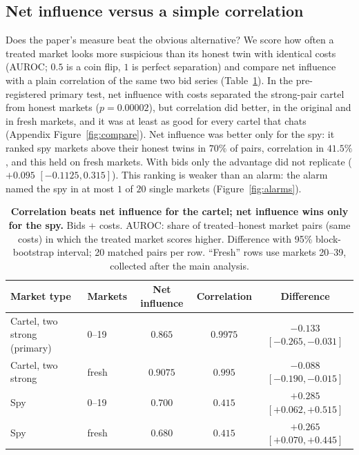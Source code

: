 \subsection{Net influence versus a simple correlation}
Does the paper's measure beat the obvious alternative? We score how often a
treated market looks more suspicious than its honest twin with identical
costs (AUROC; $0.5$ is a coin flip, $1$ is perfect separation) and compare
net influence with a plain correlation of the same two bid series
(Table~\ref{tab:compare}). In the pre-registered primary test, net
influence with costs separated the strong-pair cartel from honest markets
($p=0.00002$), but correlation did better, in the original and in fresh
markets, and it was at least as good for every cartel that chats
(Appendix Figure~\ref{fig:compare}). Net influence was better only for the
spy: it ranked spy markets above their honest twins in $70\%$ of pairs,
correlation in $41.5\%$, and this held on fresh markets. With bids only the
advantage did not replicate ($+0.095$ $[-0.1125,0.315]$). This ranking is
weaker than an alarm: the alarm named the spy in at most $1$ of $20$
single markets (Figure~\ref{fig:alarms}).

\begin{table}[t]
\centering\small
\caption{\textbf{Correlation beats net influence for the cartel; net
influence wins only for the spy.} Bids + costs. AUROC: share of
treated--honest market pairs (same costs) in which the treated market scores
higher. Difference with 95\% block-bootstrap interval; 20 matched pairs per
row. ``Fresh'' rows use markets 20--39, collected after the main analysis.}
\label{tab:compare}
\begin{tabular}{llccc}
\toprule
Market type & Markets & Net influence & Correlation & Difference \\
\midrule
Cartel, two strong (primary) & 0--19 & $0.865$ & $0.9975$ & $-0.133$ $[-0.265,-0.031]$ \\
Cartel, two strong & fresh & $0.9075$ & $0.995$ & $-0.088$ $[-0.190,-0.015]$ \\
Spy & 0--19 & $0.700$ & $0.415$ & $+0.285$ $[+0.062,+0.515]$ \\
Spy & fresh & $0.680$ & $0.415$ & $+0.265$ $[+0.070,+0.445]$ \\
\bottomrule
\end{tabular}
\end{table}

